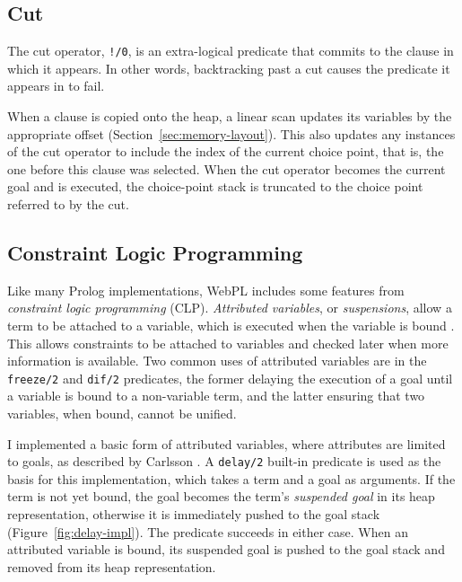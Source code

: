 \subsection{Cut}

The cut operator, \texttt{!/0}, is an extra-logical predicate that commits to the clause in which it appears. In other words, backtracking past a cut causes the predicate it appears in to fail.

When a clause is copied onto the heap, a linear scan updates its variables by the appropriate offset (Section~\ref{sec:memory-layout}). This also updates any instances of the cut operator to include the index of the current choice point, that is, the one before this clause was selected. When the cut operator becomes the current goal and is executed, the choice-point stack is truncated to the choice point referred to by the cut.

\subsection{Constraint Logic Programming}

\label{sec:attributed-variables}

Like many Prolog implementations, WebPL includes some features from \emph{constraint logic programming} (CLP). \emph{Attributed variables}, or \emph{suspensions}, allow a term to be attached to a variable, which is executed when the variable is bound \cite{holzbaurMetastructuresvsattributed1992}. This allows constraints to be attached to variables and checked later when more information is available. Two common uses of attributed variables are in the \texttt{freeze/2} and \texttt{dif/2} predicates, the former delaying the execution of a goal until a variable is bound to a non-variable term, and the latter ensuring that two variables, when bound, cannot be unified.

I implemented a basic form of attributed variables, where attributes are limited to goals, as described by Carlsson \cite{carlssonimplementationdiffreeze1986}. A \texttt{delay/2} built-in predicate is used as the basis for this implementation, which takes a term and a goal as arguments. If the term is not yet bound, the goal becomes the term's \emph{suspended goal} in its heap representation, otherwise it is immediately pushed to the goal stack (Figure~\ref{fig:delay-impl}). The predicate succeeds in either case. When an attributed variable is bound, its suspended goal is pushed to the goal stack and removed from its heap representation.

